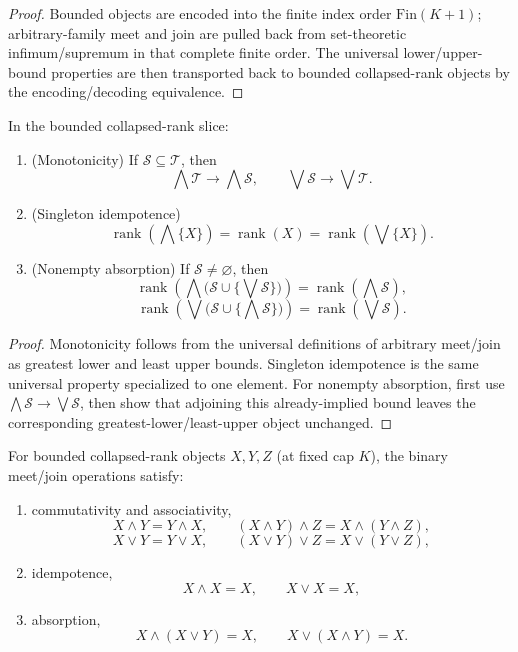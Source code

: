 \begin{proof}
Bounded objects are encoded into the finite index order $\mathrm{Fin}(K+1)$; arbitrary-family meet and join are pulled back from set-theoretic infimum/supremum in that complete finite order. The universal lower/upper-bound properties are then transported back to bounded collapsed-rank objects by the encoding/decoding equivalence.
\end{proof}

\begin{theorem}\label{thm:bounded-collapsed-rank-algebraic-laws}
In the bounded collapsed-rank slice:
\begin{enumerate}
\item (Monotonicity) If $\mathcal{S}\subseteq\mathcal{T}$, then
\[
\bigwedge\mathcal{T}\to\bigwedge\mathcal{S},
\qquad
\bigvee\mathcal{S}\to\bigvee\mathcal{T}.
\]
\item (Singleton idempotence)
\[
\operatorname{rank}(\bigwedge\{X\})=\operatorname{rank}(X)=\operatorname{rank}(\bigvee\{X\}).
\]
\item (Nonempty absorption) If $\mathcal{S}\neq\varnothing$, then
\[
\operatorname{rank}\!\left(\bigwedge\bigl(\mathcal{S}\cup\{\bigvee\mathcal{S}\}\bigr)\right)
=
\operatorname{rank}(\bigwedge\mathcal{S}),
\]
\[
\operatorname{rank}\!\left(\bigvee\bigl(\mathcal{S}\cup\{\bigwedge\mathcal{S}\}\bigr)\right)
=
\operatorname{rank}(\bigvee\mathcal{S}).
\]
\end{enumerate}
\end{theorem}

\begin{proof}
Monotonicity follows from the universal definitions of arbitrary meet/join as greatest lower and least upper bounds. Singleton idempotence is the same universal property specialized to one element. For nonempty absorption, first use $\bigwedge\mathcal{S}\to\bigvee\mathcal{S}$, then show that adjoining this already-implied bound leaves the corresponding greatest-lower/least-upper object unchanged.
\end{proof}

\begin{theorem}\label{thm:bounded-collapsed-rank-binary-calculus}
For bounded collapsed-rank objects $X,Y,Z$ (at fixed cap $K$), the binary meet/join operations satisfy:
\begin{enumerate}
\item commutativity and associativity,
\[
X\wedge Y = Y\wedge X,
\qquad
(X\wedge Y)\wedge Z = X\wedge (Y\wedge Z),
\]
\[
X\vee Y = Y\vee X,
\qquad
(X\vee Y)\vee Z = X\vee (Y\vee Z),
\]
\item idempotence,
\[
X\wedge X = X,
\qquad
X\vee X = X,
\]
\item absorption,
\[
X\wedge (X\vee Y) = X,
\qquad
X\vee (X\wedge Y) = X.
\]
\end{enumerate}
\end{theorem}

